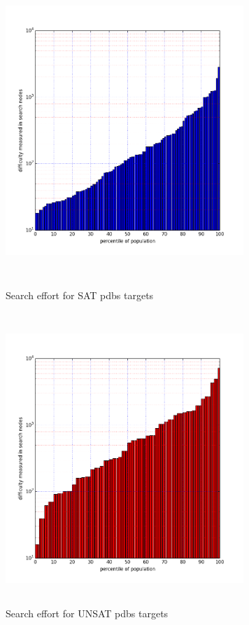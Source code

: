 \documentclass{l4proj}
\begin{document}
\begin{figure}[H]
\centering
\begin{minipage}[t]{.5\textwidth}
  \centering
  \includegraphics[height=11cm,width=9cm]{images/plots/pdbsSAT.png}
  \caption{Search effort for SAT pdbs targets}
  \label{pdbs:SAT}
\end{minipage}%
\begin{minipage}[t]{.5\textwidth}
  \centering
  \includegraphics[height=11cm,width=9cm]{images/plots/pdbsUNSAT.png}
  \caption{Search effort for UNSAT pdbs targets}
  \label{pdbs:UNSAT}
\end{minipage}
\end{figure}
\end{document}

